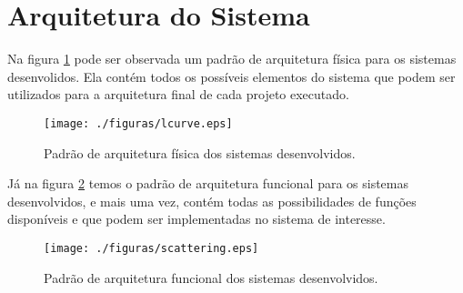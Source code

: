 	\section{Arquitetura do Sistema}

	Na figura \ref{fig:metodologia:arquiteturaFisica} pode ser observada um padrão de arquitetura física para os sistemas desenvolidos. Ela contém todos os possíveis
	elementos do sistema que podem ser utilizados para a arquitetura final de cada projeto executado. 
	\begin{figure}[h]
		\centering
		\texttt{[image: ./figuras/lcurve.eps]}
		\caption{Padrão de arquitetura física dos sistemas desenvolvidos.}
		\label{fig:metodologia:arquiteturaFisica}
	\end{figure}

	Já na figura \ref{fig:metodologia:arquiteturaFuncional} temos o padrão de arquitetura funcional para os sistemas desenvolvidos, e mais uma vez, contém todas as possibilidades
	de funções disponíveis e que podem ser implementadas no sistema de interesse.
	\begin{figure}[h]
		\centering
		\texttt{[image: ./figuras/scattering.eps]}
		\caption{Padrão de arquitetura funcional dos sistemas desenvolvidos.}
		\label{fig:metodologia:arquiteturaFuncional}
	\end{figure}